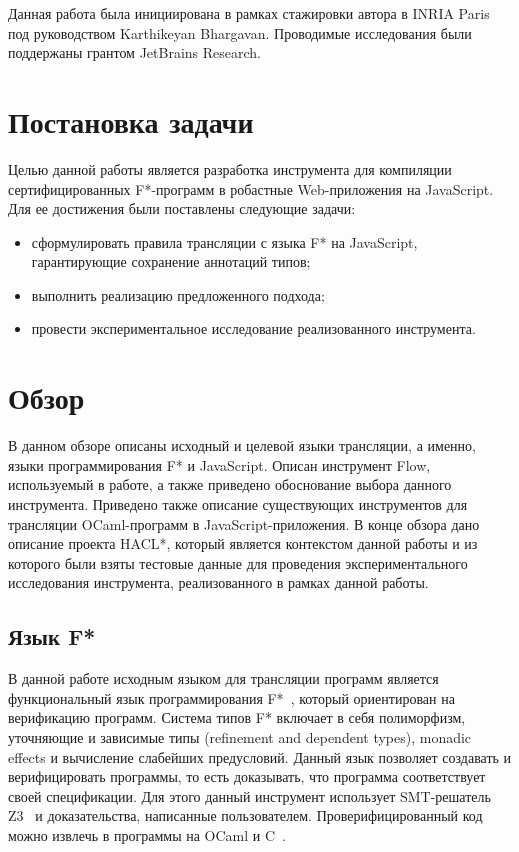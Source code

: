 Данная работа была инициирована в рамках стажировки автора в INRIA Paris под руководством Karthikeyan Bhargavan. Проводимые исследования были поддержаны грантом JetBrains Research.

\section{Постановка задачи}
Целью данной работы является разработка инструмента для компиляции сертифицированных F*-программ в робастные Web-приложения на JavaScript. Для ее достижения были поставлены следующие задачи:

\begin{itemize}
\item сформулировать правила трансляции с языка F* на JavaScript, гарантирующие сохранение аннотаций типов;
\item выполнить реализацию предложенного подхода;
\item провести экспериментальное исследование реализованного инструмента.
\end{itemize} 

\section{Обзор}

В данном обзоре описаны исходный и целевой языки трансляции, а именно, языки программирования F* и JavaScript. Описан инструмент Flow, используемый в работе, а также приведено обоснование выбора данного инструмента. Приведено также описание существующих инструментов для трансляции OCaml-программ в JavaScript-приложения. В конце обзора дано описание проекта HACL*, который является контекстом данной работы и из которого были взяты тестовые данные для проведения экспериментального исследования инструмента, реализованного в рамках данной работы. 

\subsection{Язык F*}

В данной работе исходным языком для трансляции программ является функциональный язык программирования F*~\cite{fstargh, fstarCite, fstar}, который ориентирован на верификацию программ. Система типов F* включает в себя полиморфизм, уточняющие и зависимые типы (refinement and dependent types), monadic effects и вычисление слабейших предусловий. Данный язык позволяет создавать и верифицировать программы, то есть доказывать, что программа соответствует своей спецификации. Для этого данный инструмент использует SMT-решатель Z3~\cite{z3Cite} и доказательства, написанные пользователем. Проверифицированный код можно извлечь в программы на OCaml и C~\cite{kremlin}. 

